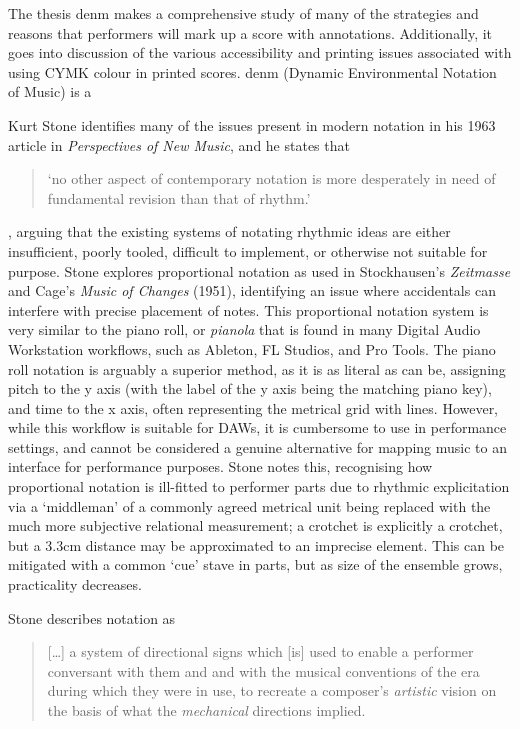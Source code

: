 The thesis denm makes a comprehensive study of many of the strategies and reasons that performers will mark up a score with annotations. 
Additionally, it goes into discussion of the various accessibility and printing issues associated with using CYMK colour in printed scores.\autocite[22--29]{bean}
denm (Dynamic Environmental Notation of Music) is a 

Kurt Stone identifies many of the issues present in modern notation in his 1963 article in \emph{Perspectives of New Music}, and he states that \begin{quotation}
    `no other aspect of contemporary notation is more desperately in need of fundamental revision than that of rhythm.'
\end{quotation}, arguing that the existing systems of notating rhythmic ideas are either insufficient, poorly tooled, difficult to implement, or otherwise not suitable for purpose.\autocite[20--22]{stoneProblemsMethodsNotation1963}
Stone explores proportional notation as used in Stockhausen's \emph{Zeitmasse} and Cage's \emph{Music of Changes} (1951), identifying an issue where accidentals can interfere with precise placement of notes. 
This proportional notation system is very similar to the piano roll, or \emph{pianola} that is found in many Digital Audio Workstation workflows, such as Ableton, FL Studios, and Pro Tools.
The piano roll notation is arguably a superior method, as it is as literal as can be, assigning pitch to the y axis (with the label of the y axis being the matching piano key), and time to the x axis, often representing the metrical grid with lines.
However, while this workflow is suitable for DAWs, it is cumbersome to use in performance settings, and cannot be considered a genuine alternative for mapping music to an interface for performance purposes.
Stone notes this, recognising how proportional notation is ill-fitted to performer parts due to rhythmic explicitation via a `middleman' of a commonly agreed metrical unit being replaced with the much more subjective relational measurement; a crotchet is explicitly a crotchet, but a 3.3cm distance may be approximated to an imprecise element.
This can be mitigated with a common `cue' stave in parts, but as size of the ensemble grows, practicality decreases.

Stone describes notation as \begin{quotation}
    [\dots] a system of directional signs which [is] used to enable a performer conversant with them and and with the musical conventions of the era during which they were in use, to recreate a composer's \emph{artistic} vision on the basis of what the \emph{mechanical} directions implied.
\end{quotation}

